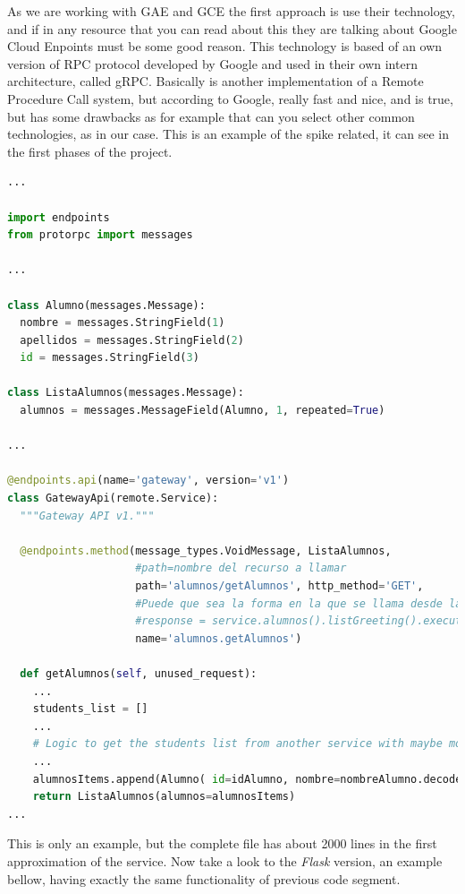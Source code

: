 As we are working with GAE and GCE the first approach is use
their technology, and if in any resource that you can read about this
they are talking about Google Cloud Enpoints must be some good reason.
This technology is based of an own version of RPC protocol developed
by Google and used in their own intern architecture, called gRPC.
\intro
Basically is another implementation of a Remote Procedure Call
system, but according to Google, really fast and nice, and is true, but has some
drawbacks as for example that can you select other common technologies, as in
our case.
\intro
This is an example of the spike related, it can see in the first phases of the
project.

\begin{lstlisting}[language=python,frame=none]
...

import endpoints
from protorpc import messages

...

class Alumno(messages.Message):
  nombre = messages.StringField(1)
  apellidos = messages.StringField(2)
  id = messages.StringField(3)

class ListaAlumnos(messages.Message):
  alumnos = messages.MessageField(Alumno, 1, repeated=True)

...

@endpoints.api(name='gateway', version='v1')
class GatewayApi(remote.Service):
  """Gateway API v1."""

  @endpoints.method(message_types.VoidMessage, ListaAlumnos,
                    #path=nombre del recurso a llamar
                    path='alumnos/getAlumnos', http_method='GET',
                    #Puede que sea la forma en la que se llama desde la api:
                    #response = service.alumnos().listGreeting().execute()
                    name='alumnos.getAlumnos')

  def getAlumnos(self, unused_request):
    ...
    students_list = []
    ...
    # Logic to get the students list from another service with maybe more logic.
    ...
    alumnosItems.append(Alumno( id=idAlumno, nombre=nombreAlumno.decode('utf-8'), apellidos=apellidosAlumno.decode('utf-8') ) )
    return ListaAlumnos(alumnos=alumnosItems)
...
\end{lstlisting}

\noindent This is only an example, but the complete file has about 2000 lines in the first
approximation of the service.
Now take a look to the \emph{Flask} version, an example bellow,  having exactly
the same functionality of previous code segment.

